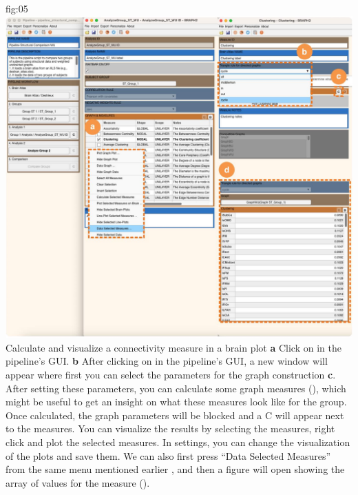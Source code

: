 \documentclass[justified]{tufte-handout}
\begin{document}
	{fig:05}
	{
	\includegraphics{fig05.jpg}
	}
	{Calculate and visualize a connectivity measure in a brain plot}
	{
	{\bf a} Click on  in the pipeline's GUI.
        {\bf b} After clicking on  in the pipeline's GUI, a new window will appear where first you can select the parameters for the graph construction {\bf c}.
	}
 After setting these parameters, you can calculate some graph measures (), which might be useful to get an insight on what these measures look like for the group. Once calculated, the graph parameters will be blocked and a C will appear next to the measures. You can visualize the results by selecting the measures, right click and plot the selected measures. In settings, you can change the visualization of the plots and save them. 
 We can also first press “Data Selected Measures” from the same menu mentioned earlier , and then a figure will open showing the array of values for the measure ().
\end{document}
